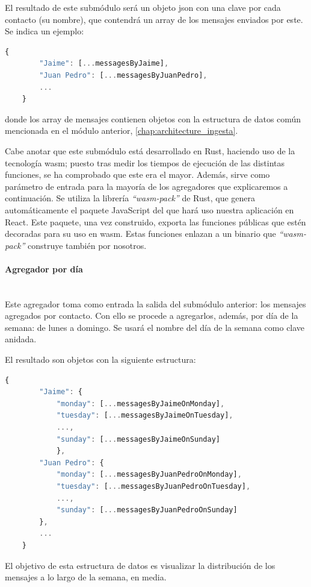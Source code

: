 El resultado de este submódulo será un objeto \acrshort{json} con una clave por cada contacto (su nombre), que contendrá un array de los mensajes enviados por este. Se indica un ejemplo:

\begin{lstlisting}[language=JavaScript]
	{
		"Jaime": [...messagesByJaime],
		"Juan Pedro": [...messagesByJuanPedro],
		...
	}
\end{lstlisting}

donde los array de mensajes contienen objetos con la estructura de datos común mencionada en el módulo anterior,  \autoref{chap:architecture_ingesta}.

Cabe anotar que este submódulo está desarrollado en Rust, haciendo uso de la tecnología \acrfull{wasm}; puesto tras medir los tiempos de ejecución de las distintas funciones, se ha comprobado que este era el mayor. Además, sirve como parámetro de entrada para la mayoría de los agregadores que explicaremos a continuación. Se utiliza la librería \textit{``wasm-pack''} de Rust, que genera automáticamente el paquete JavaScript del que hará uso nuestra aplicación en React. Este paquete, una vez construido, exporta las funciones públicas que estén decoradas para su uso en \acrshort{wasm}. Estas funciones enlazan a un binario que \textit{``wasm-pack''} construye también por nosotros.

\paragraph{Agregador por día}\mbox{}\\

Este agregador toma como entrada la salida del submódulo anterior: los mensajes agregados por contacto. Con ello se procede a agregarlos, además, por día de la semana: de lunes a domingo. Se usará el nombre del día de la semana como clave anidada.

El resultado son objetos con la siguiente estructura:

\begin{lstlisting}[language=JavaScript]
	{
		"Jaime": {
			"monday": [...messagesByJaimeOnMonday],
			"tuesday": [...messagesByJaimeOnTuesday],
			...,
			"sunday": [...messagesByJaimeOnSunday]
			},
		"Juan Pedro": {
			"monday": [...messagesByJuanPedroOnMonday],
			"tuesday": [...messagesByJuanPedroOnTuesday],
			...,
			"sunday": [...messagesByJuanPedroOnSunday]
		},
		...
	}
\end{lstlisting}

El objetivo de esta estructura de datos es visualizar la distribución de los mensajes a lo largo de la semana, en media.

